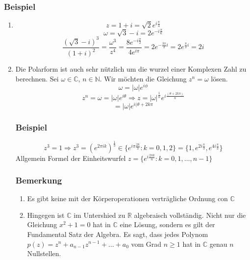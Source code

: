 \subsubsection*{Beispiel}
\begin{enumerate}
\item \[z=1+i=\sqrt{2}e^{i\frac{\pi}{4}}\]
\[\omega=\sqrt{3}-i=2e^{-i\frac{\pi}{6}}\]
\[\frac{\left(\sqrt{3}-i\right)^3}{(1+i)^2}=\frac{\omega^3}{z^4}=\frac{8e^{-i\frac{\pi}{2}}}{4e^{i\pi}}=2e^{-\frac{3\pi}{2}i}=2e^{\frac{\pi}{2}i}=2i\]
\item Die Polarform ist auch sehr nützlich um die wurzel einer Komplexen Zahl zu berechnen. Sei $\omega\in\mathbb{C}$, $n\in\mathbb{N}$. Wir möchten die Gleichung $z^n=\omega$ lösen. 
\[\omega=\left|\omega\right| e^{i\phi}\]
\[z^n=\omega=\left|\omega\right| e^{i\theta}\Rightarrow z=\left| \omega\right|^\frac{1}{n}e^{i\frac{\left(\theta + 2k\pi\right)}{n}}\]
\[=\left| \omega\right| e^{i(\theta +2k\pi}\]
\subsubsection*{Beispiel}
\[z^3=1\Rightarrow z^3=\left( e^{2\pi i k}\right)^\frac{1}{3} \in \{e^{i\pi\frac{2k}{3}}: k=0,1,2\} = \{1,e^{2i\frac{\pi}{3}},e^{4i\frac{\pi}{3}} \}\]
Allgemein Formel der Einheitswurfel $z=\{ e^{i\frac{2\pi k}{n}}:k=0,1,\dots,n-1\}$
\subsubsection*{Bemerkung}
\begin{enumerate}
\item Es gibt keine mit der Körperoperationen verträgliche Ordnung con $\mathbb{C}$
\item Hingegen ist $\mathbb{C}$ im Untershied zu $\mathbb{R}$ algebraisch vollständig. Nicht nur die Gleichung $x^2+1=0$ hat in $\mathbb{C}$ eine Lösung, sondern es gilt der Fundamental Satz der Algebra. Es sagt, dass jedes Polynom $p(z)=z^n+a_{n-1}z^{n-1}+\dots+a_0$ vom Grad $n\geq 1$ hat in $\mathbb{C}$ genau $n$ Nullstellen.
\end{enumerate}
\end{enumerate}











